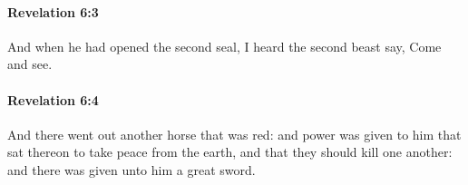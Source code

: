 		\paragraph{Revelation 6:3} %
			\label{REVELATIONNT-6-3}

			And when he had opened the second seal, I heard the second beast say, Come and see.

			\begin{framed}
			\scriptsize
				\begin{compactdesc}
					\item[SBLG] 
				\end{compactdesc}
			\end{framed}

		\paragraph{Revelation 6:4} %
			\label{REVELATIONNT-6-4}

			And there went out another horse that was red: and power was given to him that sat thereon to take peace from the earth, and that they should kill one another: and there was given unto him a great sword.

